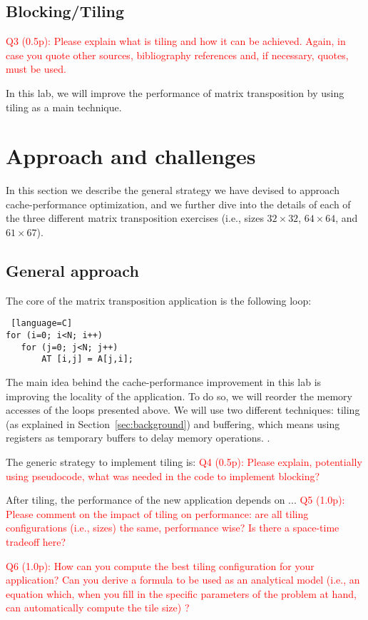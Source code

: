 \documentclass[11pt]{article}
\newcommand \question[1]{\textcolor{red}{#1}}
\begin{document}
\subsection*{Blocking/Tiling} 
\question{Q3 (0.5p): Please explain what is tiling and how it can be achieved. Again, in case you quote other sources, bibliography references and, if necessary, quotes, must be used. }

In this lab, we will improve the performance of matrix transposition by using tiling as a main technique. 
 
\section{Approach and challenges}
In this section we describe the general strategy we have devised to approach cache-performance optimization, and we further dive into the details of each of the three different matrix transposition exercises (i.e., sizes $32 \times 32$, $64 \times 64$, and $61 \times 67$).

\subsection*{General approach}
The core of the matrix transposition application is the following loop:
\begin{lstlisting} [language=C]
for (i=0; i<N; i++) 
   for (j=0; j<N; j++) 
   	   AT [i,j] = A[j,i];
\end{lstlisting}

The main idea behind the cache-performance improvement in this lab is improving the locality of the application. To do so, we will reorder the memory accesses of the loops presented above. We will use two different techniques: tiling (as explained in Section~\ref{sec:background}) and buffering, which means using registers as temporary buffers to delay memory operations. .

The generic strategy to implement tiling is: 
\question{Q4 (0.5p): Please explain, potentially using pseudocode, what was needed in the code to implement blocking?}

After tiling, the performance of the new application depends on ... 
\question{Q5 (1.0p): Please comment on the impact of tiling on performance: are all tiling configurations (i.e., sizes) the same, performance wise? Is there a space-time tradeoff here?} 

\question{Q6 (1.0p): How can you compute the best tiling configuration for your application? Can you derive a formula to be used as an analytical model (i.e., an equation which, when you fill in the specific parameters of the problem at hand, can automatically compute the tile size) ? }
\end{document}
